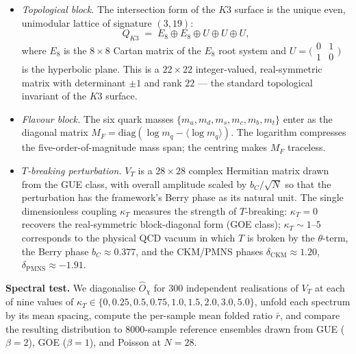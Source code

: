 \documentclass[11pt,a4paper]{article}
\newcommand{\Opchi}{\hat{O}_\chi}
\theoremstyle{plain}
\theoremstyle{definition}
\theoremstyle{remark}
\begin{document}
\begin{itemize}[leftmargin=1.6em,itemsep=2pt]
  \item \emph{Topological block.}  The intersection form of the
        $K3$ surface is the unique even, unimodular lattice of
        signature $(3,19)$:
        \begin{equation}
          Q_{K3} \;=\; E_8 \oplus E_8 \oplus U \oplus U \oplus U,
        \end{equation}
        where $E_8$ is the $8 \times 8$ Cartan matrix of the
        $E_8$ root system and $U = \bigl(\begin{smallmatrix}0 & 1 \\ 1 & 0\end{smallmatrix}\bigr)$
        is the hyperbolic plane.  This is a $22 \times 22$
        integer-valued, real-symmetric matrix with determinant
        $\pm 1$ and rank $22$ --- the standard topological
        invariant of the $K3$ surface.
  \item \emph{Flavour block.}  The six quark masses
        $\{m_u, m_d, m_s, m_c, m_b, m_t\}$ enter as the diagonal
        matrix $M_F = \mathrm{diag}(\log m_q - \langle \log m_q
        \rangle)$.  The logarithm compresses the five-order-of-magnitude
        mass span; the centring makes $M_F$ traceless.
  \item \emph{$T$-breaking perturbation.}  $V_T$ is a $28 \times 28$
        complex Hermitian matrix drawn from the GUE class, with
        overall amplitude scaled by $b_C / \sqrt{N}$ so that the
        perturbation has the framework's Berry phase as its natural
        unit.  The single dimensionless coupling $\kappa_T$ measures
        the strength of $T$-breaking: $\kappa_T = 0$ recovers the
        real-symmetric block-diagonal form (GOE class); $\kappa_T
        \sim 1$--$5$ corresponds to the physical QCD vacuum in
        which $T$ is broken by the $\theta$-term, the Berry phase
        $b_C \approx 0.377$, and the CKM/PMNS phases $\delta_{\mathrm{CKM}}
        \approx 1.20$, $\delta_{\mathrm{PMNS}} \approx -1.91$.
\end{itemize}

\medskip\noindent
\textbf{Spectral test.}  We diagonalise $\Opchi$ for $300$
independent realisations of $V_T$ at each of nine values of
$\kappa_T \in \{0, 0.25, 0.5, 0.75, 1.0, 1.5, 2.0, 3.0, 5.0\}$,
unfold each spectrum by its mean spacing, compute the per-sample
mean folded ratio $\bar r$, and compare the resulting distribution
to $8000$-sample reference ensembles drawn from GUE ($\beta = 2$),
GOE ($\beta = 1$), and Poisson at $N = 28$.
\end{document}

